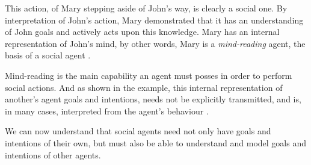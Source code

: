 This action, of Mary stepping aside of John's way, is clearly a social one.
By interpretation of John's action, Mary demonstrated that it has an understanding of John goals and actively acts upon this knowledge.
Mary has an internal representation of John's mind, by other words, Mary is a \textit{mind-reading} agent, the basis of a social agent \cite{castelfranchi:socialactions}.

Mind-reading is the main capability an agent must posses in order to perform social actions.
And as shown in the example, this internal representation of another's agent goals and intentions, needs not be explicitly transmitted, and is, in many cases, interpreted from the agent's behaviour \cite{castelfranchi:socialactions}.

We can now understand that social agents need not only have goals and intentions of their own, but must also be able to understand and model goals and intentions of other agents.

